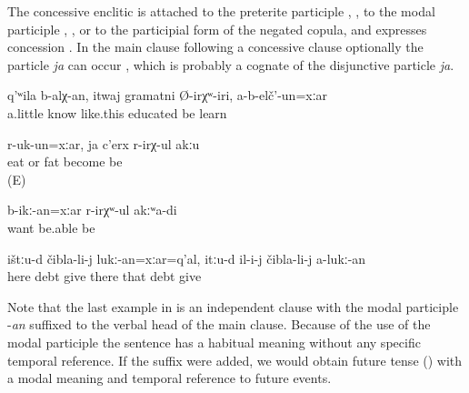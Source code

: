 The concessive enclitic  is attached to the preterite participle , , to the modal participle , , or to the participial form of the negated copula, and expresses concession . In the main clause following a concessive clause optionally the particle \textit{ja} can occur , which is probably a cognate of the disjunctive particle \textit{ja}.
%
\begin{exe}
	\ex	\label{ex:Knowledgeable, he was educated even if he did not study}
	\gll	q'ʷila	b-alχ-an,	itwaj	gramatni	Ø-irχʷ-iri,	a-b-elč'-un=xːar\\
		a.little	know	like.this	educated	be	learn\\
	\glt	{}

	\ex	\label{ex:Although she eats, she does not get fat}
	\gll	r-uk-un=xːar,	ja	c'erx	r-irχ-ul	akːu\\
		eat	or	fat	become	be\\
	\glt	{} (E)

	\ex	\label{ex:‎Although I want, I cannot}
	\gll	b-ikː-an=xːar	r-irχʷ-ul	akːʷa-di\\
		want	be.able	be\\
	\glt	{}

	\ex	\label{ex:‎T‎hough they give here (stuff) for debts, there they do not give him (food) for debts}
	\gll	ištːu-d	čibla-li-j	lukː-an=xːar=q'al,	itːu-d	il-i-j	čibla-li-j	a-lukː-an\\
		here	debt	give	there	that\tsc{-obl-dat}	debt	give\\
	\glt	{}
\end{exe}

Note that the last example in  is an independent clause with the modal participle -\textit{an} suffixed to the verbal head of the main clause. Because of the use of the modal participle the sentence has a habitual meaning without any specific temporal reference. If the suffix  were added, we would obtain future tense () with a modal meaning and temporal reference to future events.

